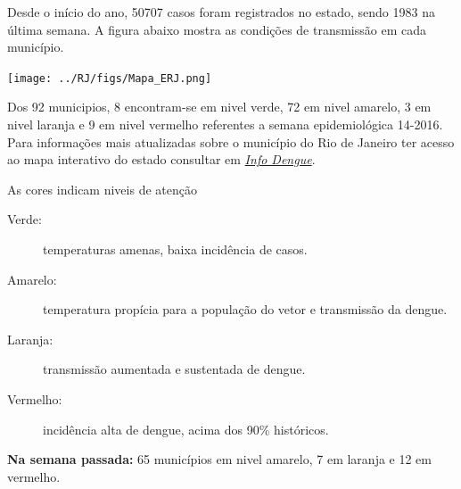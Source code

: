 \documentclass[10pt]{article} %
\begin{document}
\begin{minipage}[t]{.66\linewidth} %

\hypertarget{estado}{} %

Desde o início do ano, 50707 casos foram registrados no estado, sendo 1983 na última semana. A figura abaixo mostra as condições de transmissão em cada município.

\texttt{[image: ../RJ/figs/Mapa\_ERJ.png]}

Dos 92 municipios, 8 encontram-se em nivel verde, 72 em nivel amarelo, 3 em nivel laranja e 9 em nivel vermelho referentes a semana epidemiológica 14-2016. Para informações mais atualizadas
sobre o município do Rio de Janeiro ter acesso ao mapa interativo do estado consultar em \href{http://info.dengue.mat.br}{\textit{Info Dengue}}.


\vspace{1cm}
\begin{mdframed}[style=intextbox,frametitle={}] %

\hypertarget{descriptivebox}{} %
As cores indicam niveis de atenção
\begin{description}
\item[Verde:] temperaturas amenas, baixa incidência de casos.      
\item[Amarelo:] temperatura propícia para a população do vetor e transmissão da dengue.
\item[Laranja:] transmissão aumentada e sustentada de dengue. 
\item[Vermelho:] incidência alta de dengue, acima dos 90\% históricos.
\end{description}
\end{mdframed}

\textbf{Na semana passada:} 65 municípios em nivel amarelo, 7 em laranja e 12 em vermelho.  

\end{minipage} %
\end{document}
